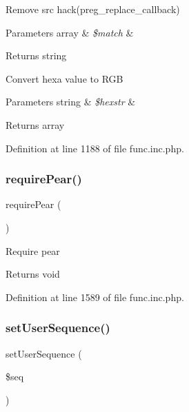 Remove src hack(preg\+\_\+replace\+\_\+callback)


\begin{DoxyParams}[1]{Parameters}
array & {\em \$match} & \\
\hline
\end{DoxyParams}
\begin{DoxyReturn}{Returns}
string 
\end{DoxyReturn}
Convert hexa value to R\+GB


\begin{DoxyParams}[1]{Parameters}
string & {\em \$hexstr} & \\
\hline
\end{DoxyParams}
\begin{DoxyReturn}{Returns}
array
\end{DoxyReturn}


Definition at line 1188 of file func.\+inc.\+php.

\mbox{\label{func_8inc_8php_ad09c8e07e96c499b4b71d54c2950e704}} 
\subsubsection{\texorpdfstring{require\+Pear()}{requirePear()}}
{\footnotesize\ttfamily require\+Pear (\begin{DoxyParamCaption}{ }\end{DoxyParamCaption})}

Require pear

\begin{DoxyReturn}{Returns}
void 
\end{DoxyReturn}


Definition at line 1589 of file func.\+inc.\+php.

\mbox{\label{func_8inc_8php_aa3832c4893dae39987cf056c24c29392}} 
\subsubsection{\texorpdfstring{set\+User\+Sequence()}{setUserSequence()}}
{\footnotesize\ttfamily set\+User\+Sequence (\begin{DoxyParamCaption}\item[{}]{\$seq }\end{DoxyParamCaption})}

